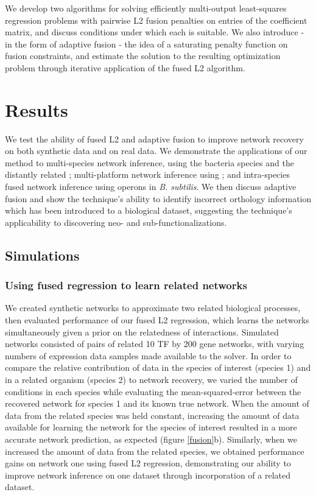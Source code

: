 \documentclass[11pt]{article}
\begin{document}
We develop two algorithms for solving efficiently multi-output least-squares regression problems with pairwise L2 fusion penalties on entries of the coefficient matrix, and discuss conditions under which each is suitable. We also introduce - in the form of adaptive fusion - the idea of a saturating penalty function on fusion constraints, and estimate the solution to the resulting optimization problem through iterative application of the fused L2 algorithm.


\section{Results}
We test the ability of fused L2 and adaptive fusion to improve network recovery on both synthetic data and on real data. We demonstrate the applications of our method to multi-species network inference, using the bacteria species  and the distantly related ; multi-platform network inference using ; and intra-species fused network inference using operons in \textit{B. subtilis}. We then discuss adaptive fusion and show the technique's ability to identify incorrect orthology information which has been introduced to a biological dataset, suggesting the technique's applicability to discovering neo- and sub-functionalizations. 

\subsection{Simulations}
\subsubsection{Using fused regression to learn related networks}
We created synthetic networks to approximate two related biological processes, then evaluated performance of our fused L2 regression, which learns the networks simultaneously given a prior on the relatedness of interactions. Simulated networks consisted of pairs of related 10 TF by 200 gene networks, with varying numbers of expression data samples made available to the solver. In order to compare the relative contribution of data in the species of interest (species 1) and in a related organism (species 2) to network recovery, we varied the number of conditions in each species while evaluating the mean-squared-error between the recovered network for species 1 and its known true network. When the amount of data from the related species was held constant, increasing the amount of data available for learning the network for the species of interest resulted in a more accurate network prediction, as expected  (figure \ref{fusion}b). Similarly, when we increased the amount of data from the related species, we obtained performance gains on network one using fused L2 regression, demonstrating our ability to improve network inference on one dataset through incorporation of a related dataset.
\end{document}
